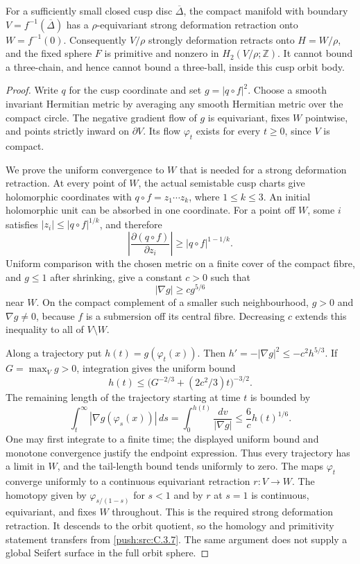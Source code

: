\begin{lemma}\label{push:src:C.3.8}
For a sufficiently small closed cusp disc \(\overline\Delta\),
the compact manifold with boundary
\(V=f^{-1}(\overline\Delta)\) has a \(\rho\)-equivariant strong
deformation retraction onto \(W=f^{-1}(0)\). Consequently
\(V/\rho\) strongly deformation retracts onto \(H=W/\rho\),
and the fixed sphere \(F\) is primitive and nonzero in
\(H_2(V/\rho;\mathbb Z)\). It cannot bound a three-chain,
and hence cannot bound a three-ball, inside this cusp orbit body.
\end{lemma}
\begin{proof}
Write \(q\) for the cusp coordinate and set \(g=|q\circ f|^2\).
Choose a smooth invariant Hermitian metric by averaging any smooth
Hermitian metric over the compact circle. The negative gradient
flow of \(g\) is equivariant, fixes \(W\) pointwise, and points
strictly inward on \(\partial V\). Its flow \(\varphi_t\) exists
for every \(t\geq0\), since \(V\) is compact.

We prove the uniform convergence to \(W\) that is needed for a
strong deformation retraction. At every point of \(W\), the
actual semistable cusp charts give holomorphic coordinates with
\(q\circ f=z_1\cdots z_k\), where \(1\leq k\leq3\).
An initial holomorphic unit can be absorbed in one coordinate.
For a point off \(W\), some \(i\) satisfies
\( |z_i|\leq|q\circ f|^{1/k}\), and therefore
\[
 \left|\frac{\partial(q\circ f)}{\partial z_i}\right|
       \geq |q\circ f|^{1-1/k}.
\]
Uniform comparison with the chosen metric on a finite cover of
the compact fibre, and \(g\leq1\) after shrinking, give a
constant \(c>0\) such that
\[
 |\nabla g|\geq c g^{5/6}
\]
near \(W\). On the compact complement of a smaller such
neighbourhood, \(g>0\) and \(\nabla g\ne0\), because
\(f\) is a submersion off its central fibre. Decreasing \(c\)
extends this inequality to all of \(V\setminus W\).

Along a trajectory put \(h(t)=g(\varphi_t(x))\). Then
\(h'=-|\nabla g|^2\leq-c^2h^{5/3}\). If
\(G=\max_V g>0\), integration gives the uniform bound
\[
 h(t)\leq\bigl(G^{-2/3}+(2c^2/3)t\bigr)^{-3/2}.
\]
The remaining length of the trajectory starting at time \(t\)
is bounded by
\[
 \int_t^\infty|\nabla g(\varphi_s(x))|\,ds
 =\int_0^{h(t)}\frac{dv}{|\nabla g|}
 \leq\frac6c h(t)^{1/6}.
\]
One may first integrate to a finite time; the displayed uniform
bound and monotone convergence justify the endpoint expression.
Thus every trajectory has a limit in \(W\), and the tail-length
bound tends uniformly to zero. The maps \(\varphi_t\) converge
uniformly to a continuous equivariant retraction \(r:V\to W\).
The homotopy given by \(\varphi_{s/(1-s)}\) for \(s<1\)
and by \(r\) at \(s=1\) is continuous, equivariant, and fixes
\(W\) throughout. This is the required strong deformation
retraction. It descends to the orbit quotient, so the homology
and primitivity statement transfers from \ref{push:src:C.3.7}. The same argument
does not supply a global Seifert surface in the full orbit sphere.
\end{proof}
